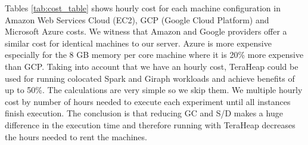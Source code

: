 Tables \ref{tab:cost_table} shows hourly cost for each machine configuration in 
Amazon Web Services Cloud (EC2), GCP (Google Cloud Platform) and Microsoft Azure costs. 
We witness that Amazon and Google providers offer a similar cost for identical machines to our server.
Azure is more expensive especially for the 8 GB memory per core machine where it is 20\% more expensive than GCP.
Taking into account that we have an hourly cost,
TeraHeap could be used for running colocated Spark and Giraph workloads
and achieve benefits of up to 50\%. The calculations are very simple so we skip them. We multiple hourly cost
by number of hours needed to execute each experiment until all instances finish execution. The conclusion is that reducing GC and S/D makes a huge difference in the execution time and therefore running with TeraHeap decreases the hours needed to rent the machines.

